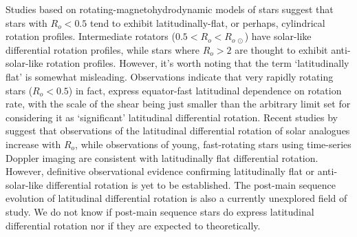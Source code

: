 Studies based on rotating-magnetohydrodynamic models of stars \citet{brun_powering_2022} suggest that stars with $R_o < 0.5$ tend to exhibit latitudinally-flat, or perhaps, cylindrical rotation profiles.
Intermediate rotators ($0.5<R_o< R_{o \ \odot}$) have solar-like differential rotation profiles, while stars where $R_o>2$ are thought to exhibit anti-solar-like rotation profiles.
However, it's worth noting that the term `latitudinally flat' is somewhat misleading. 
Observations indicate that very rapidly rotating stars ($R_o < 0.5$) in fact, express equator-fast latitudinal dependence on rotation rate, with the scale of the shear being just smaller than the arbitrary limit set for considering it as `significant' latitudinal differential rotation.
Recent studies by \citet{benomar_asteroseismic_2018} suggest that observations of the latitudinal differential rotation of solar analogues increase with $R_o$, while observations of young, fast-rotating stars using time-series Doppler imaging are consistent with latitudinally flat differential rotation. 
However, definitive observational evidence confirming latitudinally flat or anti-solar-like differential rotation is yet to be established.
The post-main sequence evolution of latitudinal differential rotation is also a currently unexplored field of study.
We do not know if post-main sequence stars do express latitudinal differential rotation nor if they are expected to theoretically.


%



